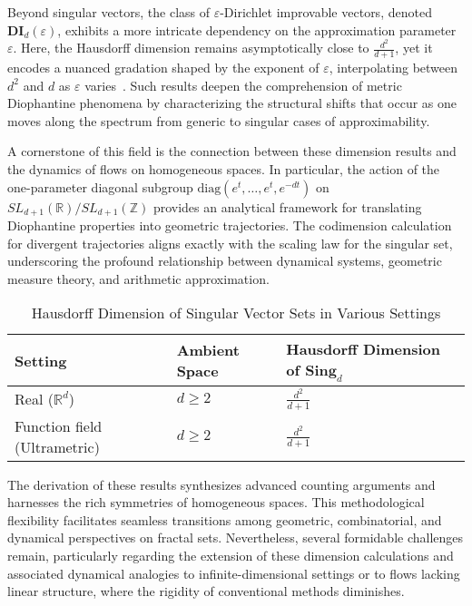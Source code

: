 Beyond singular vectors, the class of $\varepsilon$-Dirichlet improvable vectors, denoted $\mathbf{DI}_d(\varepsilon)$, exhibits a more intricate dependency on the approximation parameter $\varepsilon$. Here, the Hausdorff dimension remains asymptotically close to $\frac{d^2}{d+1}$, yet it encodes a nuanced gradation shaped by the exponent of $\varepsilon$, interpolating between $d^2$ and $d$ as $\varepsilon$ varies~\cite{ref109}. Such results deepen the comprehension of metric Diophantine phenomena by characterizing the structural shifts that occur as one moves along the spectrum from generic to singular cases of approximability.

A cornerstone of this field is the connection between these dimension results and the dynamics of flows on homogeneous spaces. In particular, the action of the one-parameter diagonal subgroup $\mathrm{diag}(e^t, \ldots, e^t, e^{-dt})$ on $SL_{d+1}(\mathbb{R})/SL_{d+1}(\mathbb{Z})$ provides an analytical framework for translating Diophantine properties into geometric trajectories. The codimension calculation for divergent trajectories aligns exactly with the scaling law for the singular set, underscoring the profound relationship between dynamical systems, geometric measure theory, and arithmetic approximation.

\begin{table*}[htbp]
\centering
\caption{Hausdorff Dimension of Singular Vector Sets in Various Settings}
\label{tab:dimension_comparison}
\begin{adjustbox}{max width=\textwidth}
\begin{tabular}{lll}
\toprule
\textbf{Setting} & \textbf{Ambient Space} & \textbf{Hausdorff Dimension of $\mathbf{Sing}_d$} \\
\midrule
Real ($\mathbb{R}^d$) & $d \geq 2$ & $\frac{d^2}{d+1}$ \\
Function field (Ultrametric) & $d \geq 2$ & $\frac{d^2}{d+1}$ \\
\bottomrule
\end{tabular}
\end{adjustbox}
\end{table*}

The derivation of these results synthesizes advanced counting arguments and harnesses the rich symmetries of homogeneous spaces. This methodological flexibility facilitates seamless transitions among geometric, combinatorial, and dynamical perspectives on fractal sets. Nevertheless, several formidable challenges remain, particularly regarding the extension of these dimension calculations and associated dynamical analogies to infinite-dimensional settings or to flows lacking linear structure, where the rigidity of conventional methods diminishes.

